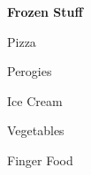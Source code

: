 \documentclass[12pt]{article}
\newcommand{\SmallSep}{\vspace{0.5em}}
\newcommand{\StoreSection}[1]
	{\Large\textbf{\color{Purple} #1}\par
	\SmallSep\normalsize}
\begin{document}
\StoreSection{Frozen Stuff}
\begin{multicols}{4}
\begin{compactitem}[\color{RoyalBlue}$\Box$]
	\item Pizza
	\item Perogies
	\item Ice Cream
	\item Vegetables
    \item Finger Food
    \item \underline{\hspace{3cm}}
	\item \underline{\hspace{3cm}}
\end{compactitem}
\end{multicols}
\end{document}
